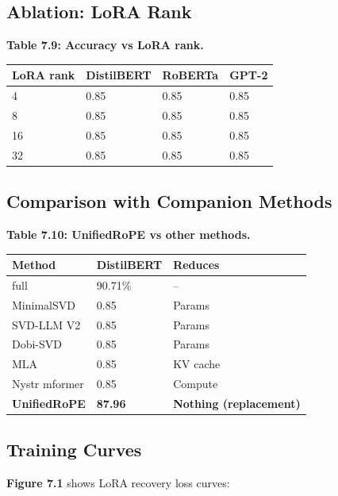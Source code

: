 \subsection{Ablation: LoRA Rank}

\textbf{Table 7.9: Accuracy vs LoRA rank.}

\begin{table}[H]
\centering
\small
\begin{tabular}{llll}
\toprule
\textbf{LoRA rank} & \textbf{DistilBERT} & \textbf{RoBERTa} & \textbf{GPT-2} \\
\midrule
4 & 0.85 & 0.85 & 0.85 \\
8 & 0.85 & 0.85 & 0.85 \\
16 & 0.85 & 0.85 & 0.85 \\
32 & 0.85 & 0.85 & 0.85 \\
\bottomrule
\end{tabular}
\end{table}

\subsection{Comparison with Companion Methods}

\textbf{Table 7.10: UnifiedRoPE vs other methods.}

\begin{table}[H]
\centering
\small
\begin{tabular}{lll}
\toprule
\textbf{Method} & \textbf{DistilBERT} & \textbf{Reduces} \\
\midrule
full & 90.71\% & -- \\
MinimalSVD & 0.85 & Params \\
SVD-LLM V2 & 0.85 & Params \\
Dobi-SVD & 0.85 & Params \\
MLA & 0.85 & KV cache \\
Nystr mformer & 0.85 & Compute \\
\textbf{UnifiedRoPE} & \textbf{87.96} & \textbf{Nothing (replacement)} \\
\bottomrule
\end{tabular}
\end{table}

\subsection{Training Curves}

\textbf{Figure 7.1} shows LoRA recovery loss curves:

